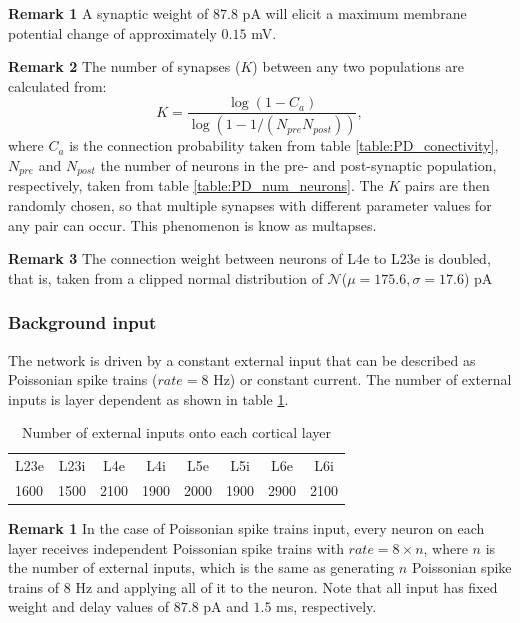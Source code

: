 \documentclass[11pt]{scrartcl}
\begin{document}
\textbf{Remark 1} A synaptic weight of \(87.8\) pA will elicit a maximum membrane potential change of approximately \(0.15\) mV.

\textbf{Remark 2} The number of synapses (\(K\)) between any two populations are calculated from:
\begin{equation}
    K = \frac{\log(1 - C_a)}{\log(1-1/(N_{pre}N_{post}))},
    \label{eq:PD_K}
\end{equation}
where \(C_a\) is the connection probability taken from table \ref{table:PD_conectivity}, \(N_{pre}\) and \(N_{post}\) the number of neurons in the pre- and post-synaptic population, respectively, taken from table \ref{table:PD_num_neurons}. The \(K\) pairs are then randomly chosen, so that multiple synapses with different parameter values for any pair can occur. This phenomenon is know as multapses.

\textbf{Remark 3} The connection weight between neurons of L4e to L23e is doubled, that is, taken from a clipped normal distribution of \(\mathcal{N}\)(\(\mu = 175.6, \sigma = 17.6\)) pA

\subsubsection{Background input}
\label{sec:orgdf688cb}
\label{org4820a61}

The network is driven by a constant external input that can be described as Poissonian spike trains (\(rate = 8\) Hz) or constant current. The number of external inputs is layer dependent as shown in table \ref{table:PD_ext_num_neurons}.

\begin{table}[htbp]
    \centering
    \caption{Number of external inputs onto each cortical layer}
    \label{table:PD_ext_num_neurons}
    \begin{tabular}{llllllll}
         \multicolumn{1}{c}{L23e} & \multicolumn{1}{c}{L23i} & \multicolumn{1}{c}{L4e} & \multicolumn{1}{c}{L4i} & \multicolumn{1}{c}{L5e} & \multicolumn{1}{c}{L5i} & \multicolumn{1}{c}{L6e} & \multicolumn{1}{c}{L6i} \\
         1600 & 1500 & 2100 & 1900 & 2000 & 1900 & 2900 & 2100 
    \end{tabular}
\end{table}

\textbf{Remark 1} In the case of Poissonian spike trains input, every neuron on each layer receives independent Poissonian spike trains with \(rate = 8 \times n\), where \(n\) is the number of external inputs, which is the same as generating \(n\) Poissonian spike trains of \(8\) Hz and applying all of it to the neuron. Note that all input has fixed weight and delay values of \(87.8\) pA and \(1.5\) ms, respectively.
\end{document}
